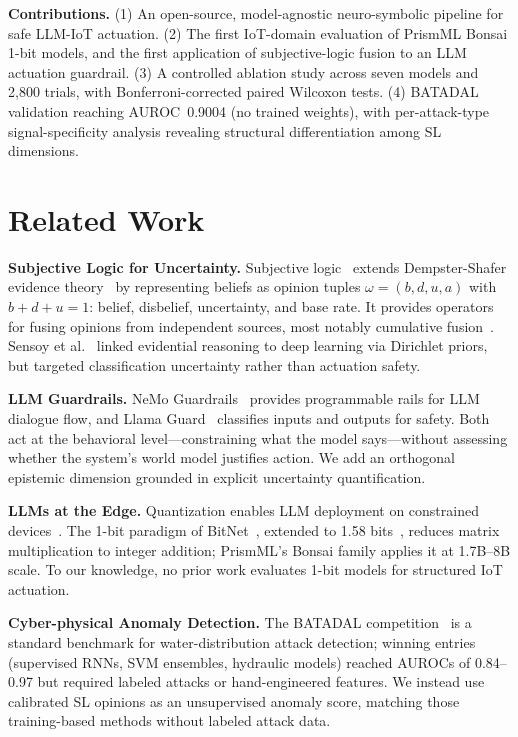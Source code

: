 \documentclass[conference]{IEEEtran}
\begin{document}
\textbf{Contributions.}
(1) An open-source, model-agnostic neuro-symbolic pipeline for safe LLM-IoT actuation.
(2) The first IoT-domain evaluation of PrismML Bonsai 1-bit models, and the first application of subjective-logic fusion to an LLM actuation guardrail.
(3) A controlled ablation study across seven models and 2{,}800 trials, with Bonferroni-corrected paired Wilcoxon tests.
(4) BATADAL validation reaching AUROC~0.9004 (no trained weights), with per-attack-type signal-specificity analysis revealing structural differentiation among SL dimensions.

\section{Related Work}

\textbf{Subjective Logic for Uncertainty.}
Subjective logic~\cite{josang2016subjective} extends Dempster-Shafer evidence theory~\cite{dempster1968generalization, shafer1976mathematical} by representing beliefs as opinion tuples $\omega = (b, d, u, a)$ with $b + d + u = 1$: belief, disbelief, uncertainty, and base rate. It provides operators for fusing opinions from independent sources, most notably cumulative fusion~\cite{josang2016subjective}. Sensoy et al.~\cite{sensoy2018evidential} linked evidential reasoning to deep learning via Dirichlet priors, but targeted classification uncertainty rather than actuation safety.

\textbf{LLM Guardrails.}
NeMo Guardrails~\cite{rebedea2023nemo} provides programmable rails for LLM dialogue flow, and Llama Guard~\cite{inan2023llama} classifies inputs and outputs for safety. Both act at the behavioral level---constraining what the model says---without assessing whether the system's world model justifies action. We add an orthogonal epistemic dimension grounded in explicit uncertainty quantification.

\textbf{LLMs at the Edge.}
Quantization enables LLM deployment on constrained devices~\cite{frantar2023gptq, lin2024awq}. The 1-bit paradigm of BitNet~\cite{wang2023bitnet}, extended to 1.58 bits~\cite{ma2024era}, reduces matrix multiplication to integer addition; PrismML's Bonsai family applies it at 1.7B--8B scale. To our knowledge, no prior work evaluates 1-bit models for structured IoT actuation.

\textbf{Cyber-physical Anomaly Detection.}
The BATADAL competition~\cite{taormina2018battle} is a standard benchmark for water-distribution attack detection; winning entries (supervised RNNs, SVM ensembles, hydraulic models) reached AUROCs of 0.84--0.97 but required labeled attacks or hand-engineered features. We instead use calibrated SL opinions as an unsupervised anomaly score, matching those training-based methods without labeled attack data.
\end{document}
